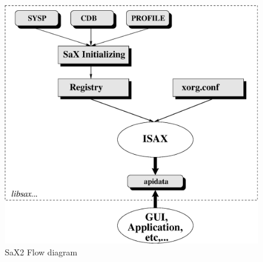 \begin{figure}[h]
\caption{SaX2 Flow diagram}
\vspace*{0.2cm}
\includegraphics[scale=0.5]{pictures/sax.eps}
\end{figure}

